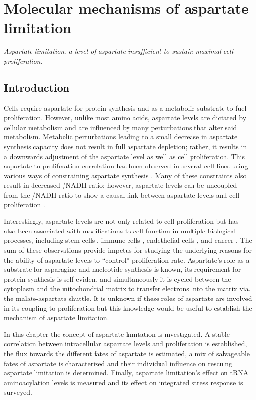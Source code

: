 \chapter{Molecular mechanisms of aspartate limitation}
\label{chap2}
\textit{Aspartate limitation, a level of aspartate insufficient to sustain maximal cell proliferation.}


\section{Introduction}
Cells require aspartate for protein synthesis and as a metabolic substrate to fuel proliferation.
However, unlike most amino acids, aspartate levels are dictated by cellular metabolism and are influenced by many perturbations that alter said metabolism.
Metabolic perturbations leading to a small decrease in aspartate synthesis capacity does not result in full aspartate depletion; rather, it results in a downwards adjustment of the aspartate level as well as cell proliferation.
This aspartate to proliferation correlation has been observed in several cell lines using various ways of constraining aspartate synthesis \cite{Sullivan2015-xf, Birsoy2015-pg, Gui2016-ca}.
Many of these constraints also result in decreased \NAD{}/NADH ratio; however, aspartate levels can be uncoupled from the \NAD{}/NADH ratio to show a causal link between aspartate levels and cell proliferation \cite{Sullivan2018-gz, Garcia-Bermudez2018-mj}.

Interestingly, aspartate levels are not only related to cell proliferation but has also been associated with modifications to cell function in multiple biological processes, including stem cells \cite{Tournaire2022-ut, Arnold2022-ft}, immune cells \cite{Bailis2019-mf}, endothelial cells \cite{Diebold2019-hh}, and cancer \cite{Helenius2021-ht}.
The sum of these observations provide impetus for studying the underlying reasons for the ability of aspartate levels to ``control'' proliferation rate.
Aspartate's role as a substrate for asparagine and nucleotide synthesis is known, its requirement for protein synthesis is self-evident and simultaneously it is cycled between the cytoplasm and the mitochondrial matrix to transfer electrons into the matrix via. the malate-aspartate shuttle.
It is unknown if these roles of aspartate are involved in its coupling to proliferation but this knowledge would be useful to establish the mechanism of aspartate limitation.

In this chapter the concept of aspartate limitation is investigated.
A stable correlation between intracellular aspartate levels and proliferation is established, the flux towards the different fates of aspartate is estimated, a mix of salvageable fates of aspartate is characterized and their individual influence on rescuing aspartate limitation is determined.
Finally, aspartate limitation's effect on tRNA aminoacylation levels is measured and its effect on integrated stress response is surveyed.




